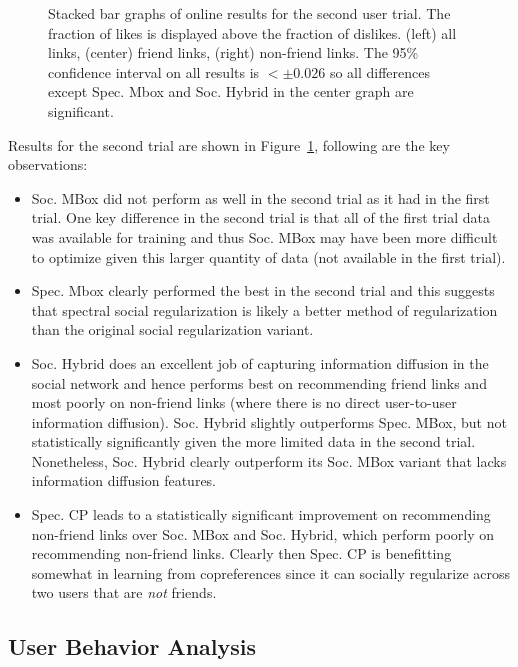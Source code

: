 \begin{figure}[t!]
\caption{Stacked bar graphs of online results for the second
user trial.  The fraction of likes is displayed above 
the fraction of dislikes.  (left) all links, (center) friend links,
(right) non-friend links. The 95\% confidence interval on all 
results is $< \pm 0.026$ so all differences except Spec. Mbox
and Soc. Hybrid in the center graph are significant. }
\label{fig:online2}
\end{figure}

Results for the second trial are 
shown in Figure~\ref{fig:online2}, following are the key observations:
\begin{itemize}
\item Soc. MBox did not perform as well in the second trial as it had
in the first trial.  One key difference in the second trial is that
all of the first trial data was available for training and thus
Soc. MBox may have been more difficult to optimize given this larger 
quantity of data (not available in the first trial).
\item Spec. Mbox clearly performed the best in the second trial 
and this suggests that spectral social 
regularization is likely a better method of regularization 
than the original social regularization variant.
\item Soc. Hybrid does an excellent job of capturing information diffusion
in the social network and hence performs best on recommending friend
links and most poorly on non-friend links (where there is no direct
user-to-user information diffusion).  Soc. Hybrid slightly outperforms
Spec. MBox, but not statistically significantly given the more limited
data in the second trial.  Nonetheless, 
Soc. Hybrid clearly outperform its Soc. MBox variant that lacks 
information diffusion features.
\item Spec. CP leads to a statistically significant improvement
on recommending non-friend links over Soc. MBox and Soc. Hybrid,
which perform poorly on recommending non-friend links.  Clearly then
Spec. CP is benefitting somewhat in learning from copreferences
since it can socially regularize across two users that are \emph{not}
friends.
\end{itemize}


\subsection{User Behavior Analysis}

